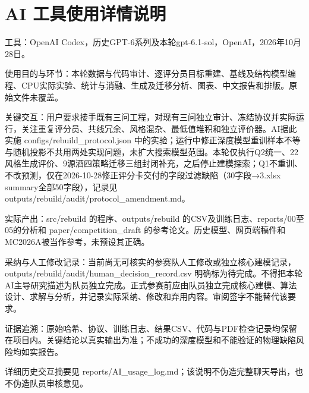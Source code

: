 \documentclass[UTF8,a4paper,zihao=-4]{ctexart}
\begin{document}
\section*{AI 工具使用详情说明}
工具：OpenAI Codex，历史GPT-6系列及本轮gpt-6.1-sol，OpenAI，2026年10月28日。

使用目的与环节：本轮数据与代码审计、逐评分员目标重建、基线及结构模型编程、CPU实际实验、统计与消融、生成及迁移分析、图表、中文报告和排版。原始文件未覆盖。

关键交互：用户要求接手既有三问工程，对现有三问独立审计、冻结协议并实际运行，关注重复评分员、共线冗余、风格混杂、最低值堆积和独立评价器。AI据此实施 configs/rebuild\_protocol.json 中的实验；运行中修正深度模型重训样本不等与随机投影不共用两处实现问题，未扩大搜索模型范围。本轮仅执行Q2统一、22风格生成评价、9源酒四策略迁移三组封闭补充，之后停止建模探索；Q1不重训、不改预测，仅在2026-10-28修正评分卡交付的字段过滤缺陷（30字段→3.xlsx summary全部50字段），记录见 outputs/rebuild/audit/protocol\_amendment.md。

实际产出：src/rebuild 的程序、outputs/rebuild 的CSV及训练日志、reports/00至05的分析和 paper/competition\_draft 的参考论文。历史模型、网页端稿件和MC2026A被当作参考，未预设其正确。

采纳与人工修改记录：当前尚无可核实的参赛队人工修改或独立核心建模记录，outputs/rebuild/audit/human\_decision\_record.csv 明确标为待完成。不得把本轮AI主导研究描述为队员独立完成。正式参赛前应由队员独立完成核心建模、算法设计、求解与分析，并记录实际采纳、修改和弃用内容。审阅签字不能替代该要求。

证据追溯：原始哈希、协议、训练日志、结果CSV、代码与PDF检查记录均保留在项目内。关键结论以真实输出为准；不成功的深度模型和不能验证的物理缺陷风险均如实报告。

详细历史交互摘要见 reports/AI\_usage\_log.md；该说明不伪造完整聊天导出，也不伪造队员审核意见。
\end{document}
